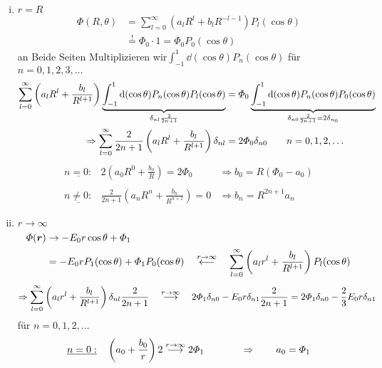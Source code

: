 \begin{enumerate}[i)]
	\item $ r = R $
	\begin{align*}
	\Phi(R,\theta) &= \sum_{l=0}^{\infty} \left(a_l R^l + b_l R^{-l-1}\right) P_l(\cos\theta)\\
	&\overset{!}{=} \Phi_0 \cdot 1 = \Phi_0 P_0(\cos\theta) 
	\end{align*}
	an Beide Seiten Multiplizieren wir$ \int_{-1}^{1} \dd (\cos \theta) P_n (\cos\theta) $ für $ n = 0,1,2,3,\dots $
	\begin{align*}
	\sum_{l=0}^{\infty} \left(a_l R^l + \frac{b_l}{R^{l+1}}\right) \underbrace{\int_{-1}^{1} \textrm{d} (\cos\theta) P_n(\cos\theta) P_l(\cos\theta)}_{\delta_{nl} \frac{2}{2n+1}} &= \varPhi_0 \underbrace{\int_{-1}^{1} \textrm{d} (\cos\theta) P_n(\cos\theta) P_0(\cos\theta)}_{\delta_{n0} \frac{2}{2n+1} = 2 \delta_{n_0}}\\
	\Rightarrow \sum_{l = 0}^{\infty} \frac{2}{2n + 1}\left(a_l R^l + \frac{b_l}{R^{l+1}}\right) \delta_{nl} &= 2 \varPhi_0 \delta_{n0} \qquad n = 0, 1, 2,\dots
	\end{align*}
	$$\begin{array}{lcl}
		\underline{n = 0:} & 2\left(a_0 R^0 + \displaystyle\frac{b_0}{R}\right) = 2 \Phi_0 &\Rightarrow b_0 = R(\Phi_0 - a_0)\\
		&&\\
		\underline{n \neq 0:} & \displaystyle\frac{2}{2n+1}\left(a_n R^n + \frac{b_n}{R^{n+1}}\right) = 0 &\Rightarrow b_n = R^{2n+1}a_n
	\end{array}$$
	\item $ r \to \infty $
	\begin{align*}
	\pofr &\rightarrow -E_0 r \cos\theta + \Phi_1\\
	&= - E_0 r P_1(\cos\theta) + \Phi_1 P_0(\cos\theta) \quad \buildrel r \to \infty \over \longleftarrow \quad \sum_{l=0}^{\infty} \left(a_l r^l + \frac{b_l}{R^{l+1}}\right) P_l(\cos\theta)
	\end{align*}
	\begin{equation*}
	\Rightarrow \sum_{l=0}^{\infty} \left(a_l r^l + \frac{b_l}{R^{l+1}}\right) \delta_{nl} \frac{2}{2n+1} \quad \buildrel r \to \infty \over \longrightarrow \quad 2 \Phi_1 \delta_{n0} - E_0 r \delta_{n1} \frac{2}{2n+1} = 2 \Phi_1 \delta_{n0} - \frac{2}{3} E_0 r \delta_{n1}
	\end{equation*}
	für $ n = 0,1,2,\dots $
	\begin{align*}
	&\underline{n = 0:} \quad \left(a_0 + \frac{b_0}{r}\right) 2 \buildrel r \to \infty \over \longrightarrow 2 \Phi_1 \qquad \quad \ \ \Rightarrow \qquad a_0 = \Phi_1\\

\end{align*}
\end{enumerate}

